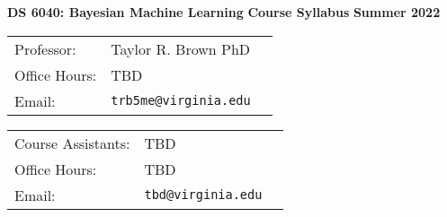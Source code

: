 \documentclass[11pt]{article}
\begin{document}
\noindent
    {\large \bf DS 6040: Bayesian Machine Learning} \hfill
    {\large \bf Course Syllabus} \hfill
    {\large \bf Summer 2022}

\bigskip

\begin{tabular}{lll}
   Professor: &  Taylor R. Brown PhD \\
   Office Hours: & TBD\\
     Email: & \verb+trb5me@virginia.edu+ \\
\end{tabular}

\vspace*{.1in}

\begin{tabular}{lll}
   Course Assistants: &  TBD  \\
   Office Hours: & TBD\\
     Email: & \verb+tbd@virginia.edu+\\
\end{tabular}
\end{document}
